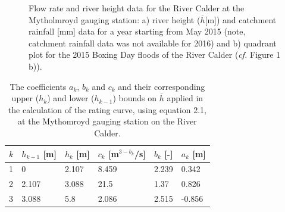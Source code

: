 \documentclass[11pt,a4paper]{article}
\begin{document}
\begin{figure}[H]
\centering
{}
\hfill
{}
\caption{Flow rate and river height data for the River Calder at the Mytholmroyd gauging station: a) river height ($\overline{h}$[m]) \cite{Calder-Don} and catchment rainfall [mm] data \cite{NRFA} for a year starting from May 2015 (note, catchment rainfall data was not available for 2016) and b) quadrant plot for the 2015 Boxing Day floods of the River Calder (\textit{cf.} Figure 1 b)).}
\end{figure}

\begin{table}[H]
\centering
\begin{tabular}{l|l|l|l|l|l}
$k$ & $h_{k-1}$ [m] & $h_k$ [m] & $c_k$ [m$^{3-b_k}$/s] & $b_k$ [-] & $a_k$ [m]\\
\hline
1 & 0 & 2.107 & 8.459 & 2.239 & 0.342 \\
2 & 2.107 & 3.088 & 21.5 & 1.37 & 0.826 \\
3 & 3.088 & 5.8 & 2.086 & 2.515 & -0.856 \\
\end{tabular}
\caption{The coefficients $a_k$, $b_k$ and $c_k$ and their corresponding upper ($h_k$) and lower ($h_{k-1}$) bounds on $\overline{h}$ \cite{Calder-Don} applied in the calculation of the rating curve, using equation 2.1, at the Mythomroyd gauging station on the River Calder.}
\end{table}
\end{document}
